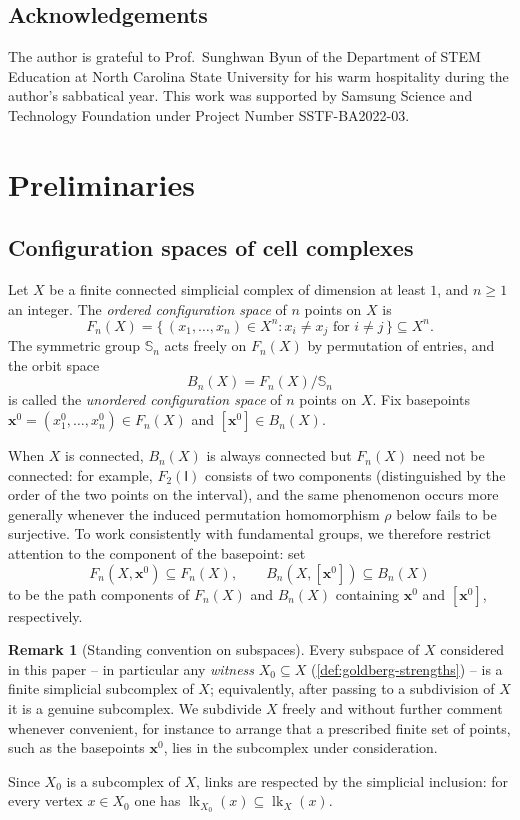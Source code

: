 \documentclass[reqno]{amsart}
\theoremstyle{definition}
\newtheorem{remark}[theorem]{Remark}
\newcommand\bfx{\mathbf{x}}
\newcommand{\base}{\bfx^0}
\DeclareMathOperator{\lk}{lk}
\numberwithin{equation}{section}
\begin{document}
\subsection*{Acknowledgements}
The author is grateful to Prof.\ Sunghwan Byun of the
Department of STEM Education at North Carolina State University
for his warm hospitality during the author's sabbatical year.
This work was supported by Samsung Science and Technology
Foundation under Project Number SSTF-BA2022-03.

\section{Preliminaries}

\subsection{Configuration spaces of cell complexes}

Let \(X\) be a finite connected simplicial complex of
dimension at least \(1\), and \(n\geq 1\) an integer. The
\emph{ordered configuration space} of \(n\) points on \(X\) is
\[
F_n (X) = \{\,(x_1, \dots, x_n) \in X^n : x_i \neq x_j
\text{ for } i \neq j\,\} \subseteq X^n.
\]
The symmetric group \(\mathbb{S}_n\) acts freely on \(F_n (X)\) by permutation
of entries, and the orbit space
\[
B_n (X) = F_n (X) / \mathbb{S}_n
\]
is called the \emph{unordered configuration space} of \(n\) points on
\(X\). Fix basepoints \(\base = (x_1^0,\dots,x_n^0)\in F_n (X)\) and
\([\base]\in B_n (X)\).

When \(X\) is connected, \(B_n(X)\) is always connected but \(F_n (X)\) need not be connected: for example, \(F_2(\mathsf{I})\)
consists of two components (distinguished by the order of the two
points on the interval), and the same phenomenon occurs more
generally whenever the induced permutation homomorphism \(\rho\)
below fails to be surjective. To work consistently with
fundamental groups, we therefore restrict attention to the
component of the basepoint: set
\[
F_n(X,\base) \subseteq F_n (X),
\qquad
B_n(X,[\base]) \subseteq B_n (X)
\]
to be the path components of \(F_n (X)\) and \(B_n (X)\) containing
\(\base\) and \([\base]\), respectively.

\begin{remark}[Standing convention on subspaces]\label{conv:subcomplex}
Every subspace of \(X\) considered in this paper -- in particular any
\emph{witness} \(X_0\subseteq X\) (\cref{def:goldberg-strengths}) -- is
a finite simplicial subcomplex of \(X\); equivalently, after passing to
a subdivision of \(X\) it is a genuine subcomplex. We subdivide \(X\)
freely and without further comment whenever convenient, for instance to
arrange that a prescribed finite set of points, such as the basepoints
\(\base\), lies in the subcomplex under consideration.

Since \(X_0\) is a subcomplex of \(X\), links are respected by the
simplicial inclusion: for every vertex \(x\in X_0\) one has
\(\lk_{X_0}(x)\subseteq\lk_X(x)\).
\end{remark}
\end{document}
